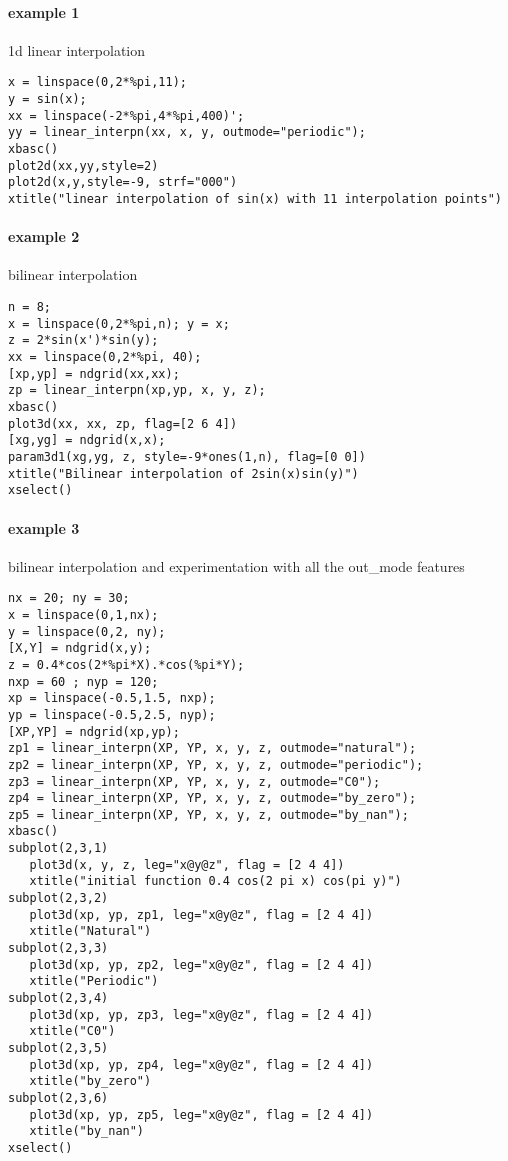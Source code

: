 
\begin{examples}
\paragraph{example 1}  1d linear interpolation
\begin{Verbatim}
x = linspace(0,2*%pi,11);
y = sin(x);
xx = linspace(-2*%pi,4*%pi,400)';
yy = linear_interpn(xx, x, y, outmode="periodic");
xbasc()
plot2d(xx,yy,style=2)
plot2d(x,y,style=-9, strf="000")
xtitle("linear interpolation of sin(x) with 11 interpolation points")
\end{Verbatim}

\paragraph{example 2} bilinear interpolation
\begin{Verbatim}
n = 8;
x = linspace(0,2*%pi,n); y = x;
z = 2*sin(x')*sin(y);
xx = linspace(0,2*%pi, 40);
[xp,yp] = ndgrid(xx,xx);
zp = linear_interpn(xp,yp, x, y, z);
xbasc()
plot3d(xx, xx, zp, flag=[2 6 4])
[xg,yg] = ndgrid(x,x);
param3d1(xg,yg, z, style=-9*ones(1,n), flag=[0 0])
xtitle("Bilinear interpolation of 2sin(x)sin(y)")
xselect()
\end{Verbatim}

\paragraph{example 3} bilinear interpolation and experimentation with all the out\_mode features
\begin{Verbatim}
nx = 20; ny = 30;
x = linspace(0,1,nx);
y = linspace(0,2, ny);
[X,Y] = ndgrid(x,y);
z = 0.4*cos(2*%pi*X).*cos(%pi*Y);
nxp = 60 ; nyp = 120;
xp = linspace(-0.5,1.5, nxp);
yp = linspace(-0.5,2.5, nyp);
[XP,YP] = ndgrid(xp,yp);
zp1 = linear_interpn(XP, YP, x, y, z, outmode="natural");
zp2 = linear_interpn(XP, YP, x, y, z, outmode="periodic");
zp3 = linear_interpn(XP, YP, x, y, z, outmode="C0");
zp4 = linear_interpn(XP, YP, x, y, z, outmode="by_zero");
zp5 = linear_interpn(XP, YP, x, y, z, outmode="by_nan");
xbasc()
subplot(2,3,1)
   plot3d(x, y, z, leg="x@y@z", flag = [2 4 4])
   xtitle("initial function 0.4 cos(2 pi x) cos(pi y)")
subplot(2,3,2)
   plot3d(xp, yp, zp1, leg="x@y@z", flag = [2 4 4])
   xtitle("Natural")
subplot(2,3,3)
   plot3d(xp, yp, zp2, leg="x@y@z", flag = [2 4 4])
   xtitle("Periodic")
subplot(2,3,4)
   plot3d(xp, yp, zp3, leg="x@y@z", flag = [2 4 4])
   xtitle("C0")
subplot(2,3,5)
   plot3d(xp, yp, zp4, leg="x@y@z", flag = [2 4 4])
   xtitle("by_zero")
subplot(2,3,6)
   plot3d(xp, yp, zp5, leg="x@y@z", flag = [2 4 4])
   xtitle("by_nan")
xselect()
\end{Verbatim}



\end{examples}
